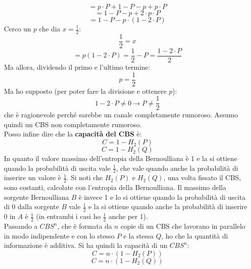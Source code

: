 \documentclass[a4paper,12pt, oneside]{book}
\begin{document}
\[=p\cdot P+1-P-p+p\cdot P\]
\[=1-P-p+2\cdot p\cdot P\]
\[=1-P-p\cdot (1-2\cdot P)\]
Cerco un $p$ che dia $x=\frac{1}{2}$:
\[\frac{1}{2}=x\]
\[=p(1-2\cdot P)=\frac{1}{2}-P=\frac{1-2\cdot P}{2}\]
Ma allora, dividendo il primo e l'ultimo termine:
\[p=\frac{1}{2}\]
Ma ho supposto (per poter fare la divisione e ottenere $p$):
\[1-2\cdot P\neq 0\to P\neq \frac{1}{2}\]
che è ragionevole perché sarebbe un canale completamente rumoroso. Assumo quindi
un CBS non completamente rumoroso.\\
Posso infine dire che la \textbf{capacità del CBS} è:
\[C=1-H_2(P)\]
\[C=1-H_2(Q)\]
In quanto il valore massimo dell'entropia della Bernoulliana è 1 e la si ottiene
quando la probabilità di uscita vale $\frac{1}{2}$, che vale quando anche la
probabilità di inserire un valore è $\frac{1}{2}$. Si noti che $H_2(P)$ e
$H_2(Q)$, una volta fissato il CBS, sono costanti, calcolate con l'entropia
della Bernoulliana. Il massimo della sorgente Bernoulliana $B$ è invece 1 e lo
si ottiene quando la probabilità di uscita di 0 dalla sorgente $B$ vale
$\frac{1}{2}$ e la si ottiene quando anche la probabilità di inserire 0 in $A$ è
$\frac{1}{2}$ (in entrambi i casi ho $\frac{1}{2}$ anche per 1). \\
Passando a $CBS^n$, che è formata da $n$ copie di un CBS che lavorano in
parallelo in modo indipendente e con lo stesso $P$ e la stessa $Q$, ho che
la quantità di informazione è additiva. Si ha quindi la capacità di un $CBS^n$:
\[C=n\cdot \left(1-H_2(P)\right)\]
\[C=n\cdot \left(1-H_2(Q)\right)\]
\end{document}
